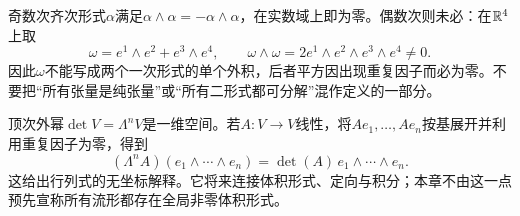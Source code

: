 \begin{example}[偶次形式的平方未必为零]
奇数次齐次形式$\alpha$满足$\alpha\wedge\alpha=-\alpha\wedge\alpha$，在实数域上即为零。偶数次则未必：在$\mathbb{R}^4$上取
\[
 \omega=e^1\wedge e^2+e^3\wedge e^4,
 \qquad \omega\wedge\omega=2e^1\wedge e^2\wedge e^3\wedge e^4\ne0.
\]
因此$\omega$不能写成两个一次形式的单个外积，后者平方因出现重复因子而必为零。不要把“所有张量是纯张量”或“所有二形式都可分解”混作定义的一部分。
\end{example}
顶次外幂$\det V=\Lambda^nV$是一维空间。若$A:V\to V$线性，将$Ae_1,\ldots,Ae_n$按基展开并利用重复因子为零，得到
\[
 (\Lambda^nA)(e_1\wedge\cdots\wedge e_n)
 =\det(A)\,e_1\wedge\cdots\wedge e_n.
\]
这给出行列式的无坐标解释。它将来连接体积形式、定向与积分；本章不由这一点预先宣称所有流形都存在全局非零体积形式。
